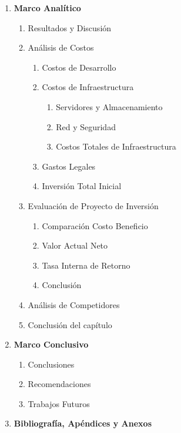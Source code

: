\begin{enumerate}[label*=\arabic*.]
\begin{enumerate}[label*=\arabic*.]
            \item Evaluación de la calidad del software
        \end{enumerate}
    \item \textbf{Marco Analítico}
        \begin{enumerate}[label*=\arabic*.]
            \item Resultados y Discusión
            \item Análisis de Costos
                \begin{enumerate}[label*=\arabic*.]
                    \item Costos de Desarrollo
                    \item Costos de Infraestructura
                    \begin{enumerate}[label*=\arabic*.]
                        \item Servidores y Almacenamiento
                        \item Red y Seguridad
                        \item Costos Totales de Infraestructura
                    \end{enumerate}
                    \item Gastos Legales
                    \item Inversión Total Inicial
                \end{enumerate}
            \item Evaluación de Proyecto de Inversión
            \begin{enumerate}[label*=\arabic*.]
                \item Comparación Costo Beneficio
                \item Valor Actual Neto
                \item Tasa Interna de Retorno
                \item Conclusión
            \end{enumerate}
            \item Análisis de Competidores
            \item Conclusión del capítulo
        \end{enumerate}
    \item \textbf{Marco Conclusivo}
        \begin{enumerate}[label*=\arabic*.]
            \item Conclusiones
            \item Recomendaciones
            \item Trabajos Futuros
        \end{enumerate}
    \item \textbf{Bibliografía, Apéndices y Anexos}
\end{enumerate}